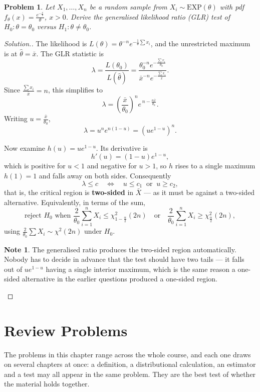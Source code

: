 \documentclass[12pt,a4paper]{report}
\theoremstyle{definition}
\newtheorem{note}[thm]{Note}
\theoremstyle{plain}
\newtheorem{problemx}{Problem}[section]
\newenvironment{problem}{\begin{problemx}}{\end{problemx}}
\newenvironment{solution}
  {\renewcommand{\qedsymbol}{}\begin{proof}[\textit{Solution}.]}
  {\end{proof}}
\begin{document}
\begin{problem}
Let $X_1,\ldots,X_n$ be a random sample from $X_i\sim\text{EXP}(\theta)$ with pdf
$f_\theta(x)=\frac{e^{-\frac{x}{\theta}}}{\theta}$, $x>0$. Derive the generalised
likelihood ratio (GLR) test of $H_0:\theta=\theta_0$ versus
$H_1:\theta\neq\theta_0$.
\end{problem}

\begin{solution}
The likelihood is $L(\theta)=\theta^{-n}e^{-\frac{1}{\theta}\sum x_i}$, and the
unrestricted maximum is at $\hat\theta=\bar x$. The GLR statistic is
\[\lambda=\frac{L(\theta_0)}{L\left(\hat\theta\right)}
=\frac{\theta_0^{-n}e^{-\frac{\sum x_i}{\theta_0}}}
{\bar x^{-n}e^{-\frac{\sum x_i}{\bar x}}}.\]
Since $\frac{\sum x_i}{\bar x}=n$, this simplifies to
\[\lambda=\left(\frac{\bar x}{\theta_0}\right)^n
e^{\,n-\frac{n\bar x}{\theta_0}}.\]
Writing $u=\frac{\bar x}{\theta_0}$,
\[\lambda=u^ne^{n(1-u)}=\left(ue^{1-u}\right)^n.\]

Now examine $h(u)=ue^{1-u}$. Its derivative is
\[h'(u)=(1-u)e^{1-u},\]
which is positive for $u<1$ and negative for $u>1$, so $h$ rises to a single
maximum $h(1)=1$ and falls away on both sides. Consequently
\[\lambda\leq c\quad\Longleftrightarrow\quad u\leq c_1\ \text{ or }\ u\geq c_2,\]
that is, the critical region is \textbf{two-sided} in $\bar X$ --- as it must be
against a two-sided alternative. Equivalently, in terms of the sum,
\[\text{reject } H_0 \text{ when }
\frac{2}{\theta_0}\sum_{i=1}^nX_i\leq\chi^2_{1-\frac{\alpha}{2}}(2n)
\quad\text{or}\quad
\frac{2}{\theta_0}\sum_{i=1}^nX_i\geq\chi^2_{\frac{\alpha}{2}}(2n),\]
using $\frac{2}{\theta_0}\sum X_i\sim\chi^2(2n)$ under $H_0$.

\begin{note}
The generalised ratio produces the two-sided region automatically. Nobody has to
decide in advance that the test should have two tails --- it falls out of
$ue^{1-u}$ having a single interior maximum, which is the same reason a one-sided
alternative in the earlier questions produced a one-sided region.
\end{note}
\end{solution}


\chapter{Review Problems}

The problems in this chapter range across the whole course, and each one draws on
several chapters at once: a definition, a distributional calculation, an estimator
and a test may all appear in the same problem. They are the best test of whether
the material holds together.
\end{document}
